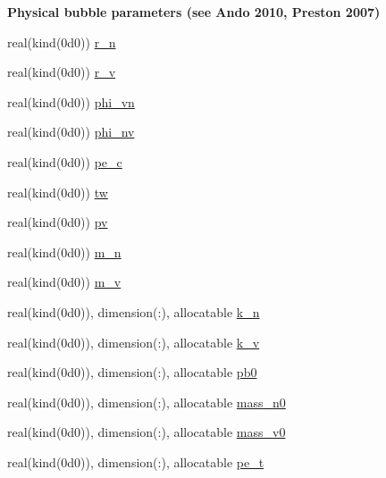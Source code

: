 \begin{Indent}\textbf{ Physical bubble parameters (see Ando 2010, Preston 2007)}\par
\begin{DoxyCompactItemize}
\item 
real(kind(0d0)) \hyperlink{namespacem__global__parameters_ae818e88601b1dc579a87e7c0c8cd87cb}{r\+\_\+n}
\item 
real(kind(0d0)) \hyperlink{namespacem__global__parameters_af2ee1ad578115833bb6b8e9550eb5f18}{r\+\_\+v}
\item 
real(kind(0d0)) \hyperlink{namespacem__global__parameters_acc6771df62005731bbec282b0c9a5659}{phi\+\_\+vn}
\item 
real(kind(0d0)) \hyperlink{namespacem__global__parameters_a7dbd1ec1fd1ece4e997a825fa07785eb}{phi\+\_\+nv}
\item 
real(kind(0d0)) \hyperlink{namespacem__global__parameters_ac1375e5145e018847d9025e83e58b49d}{pe\+\_\+c}
\item 
real(kind(0d0)) \hyperlink{namespacem__global__parameters_aa77b0836fe22478b69e10e656ef7fcc2}{tw}
\item 
real(kind(0d0)) \hyperlink{namespacem__global__parameters_acc5b8b153cee23d65a886df38f821f08}{pv}
\item 
real(kind(0d0)) \hyperlink{namespacem__global__parameters_a5600a60608bd352783350438a2efb0fe}{m\+\_\+n}
\item 
real(kind(0d0)) \hyperlink{namespacem__global__parameters_a35a6f248eec9c489110fad19d906bd40}{m\+\_\+v}
\item 
real(kind(0d0)), dimension(\+:), allocatable \hyperlink{namespacem__global__parameters_a555eda1318a218d37d1bdd8f4d57eaf2}{k\+\_\+n}
\item 
real(kind(0d0)), dimension(\+:), allocatable \hyperlink{namespacem__global__parameters_a1943ea5a5127e94a197afae57be95758}{k\+\_\+v}
\item 
real(kind(0d0)), dimension(\+:), allocatable \hyperlink{namespacem__global__parameters_a1097b95561b65a9035e5f9218de577f9}{pb0}
\item 
real(kind(0d0)), dimension(\+:), allocatable \hyperlink{namespacem__global__parameters_ae3701f74c9487c9e56c2a11fb6a52e40}{mass\+\_\+n0}
\item 
real(kind(0d0)), dimension(\+:), allocatable \hyperlink{namespacem__global__parameters_a6a06981be6cdab78452a106009022aa4}{mass\+\_\+v0}
\item 
real(kind(0d0)), dimension(\+:), allocatable \hyperlink{namespacem__global__parameters_a8a75928178eef1550c6a0389ff12b44a}{pe\+\_\+t}

\end{DoxyCompactItemize}
\end{Indent}
